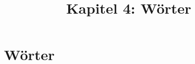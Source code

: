 \documentclass[18pt]{beamer}
\title[Wörter]{Kapitel 4: Wörter}
\begin{document}

\begin{frame}
 \titlepage
\end{frame}

\def\showSolutions{1}					 %

\section{Wörter}
\title[Wörter]{}

\end{document}
